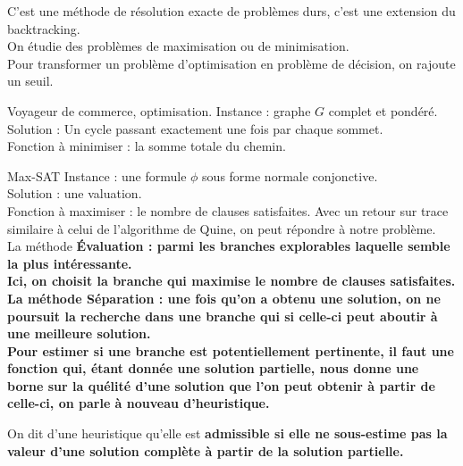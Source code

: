 \documentclass[french, 11pt]{article}
\begin{document}


\begin{defi}{}{}
    C'est une méthode de résolution exacte de problèmes durs, c'est une extension du backtracking.\\
    On étudie des problèmes de maximisation ou de minimisation.\\
    Pour transformer un problème d'optimisation en problème de décision, on rajoute un seuil. 
\end{defi}

\begin{ex}{Voyageur de commerce, optimisation.}{}
    Instance : graphe $G$ complet et pondéré.\\
    Solution : Un cycle passant exactement une fois par chaque sommet.\\
    Fonction à minimiser : la somme totale du chemin.
\end{ex}

\begin{ex}{Max-SAT}{}
    Instance : une formule $\phi$ sous forme normale conjonctive.\\
    Solution : une valuation.\\
    Fonction à maximiser : le nombre de clauses satisfaites.\n
    Avec un retour sur trace similaire à celui de l'algorithme de Quine, on peut répondre à notre problème.\\
    La méthode \bf{Évaluation} : parmi les branches explorables laquelle semble la plus intéressante.\\
    Ici, on choisit la branche qui maximise le nombre de clauses satisfaites.\\
    La méthode \bf{Séparation} : une fois qu'on a obtenu une solution, on ne poursuit la recherche dans une branche qui si celle-ci peut aboutir à une meilleure solution.\\
    Pour estimer si une branche est potentiellement pertinente, il faut une fonction qui, étant donnée une solution partielle, nous donne une borne sur la quélité d'une solution que l'on peut obtenir à partir de celle-ci, on parle à nouveau d'heuristique.
\end{ex}

\begin{defi}{}{}
    On dit d'une heuristique qu'elle est \bf{admissible} si elle ne sous-estime pas la valeur d'une solution complète à partir de la solution partielle.
\end{defi}
\end{document}
